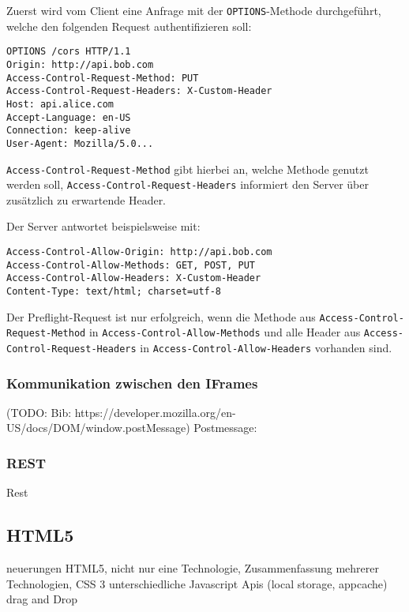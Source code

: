 Zuerst wird vom Client eine Anfrage mit der \texttt{OPTIONS}-Methode durchgeführt, welche den folgenden Request authentifizieren soll:
\begin{lstlisting}
OPTIONS /cors HTTP/1.1
Origin: http://api.bob.com
Access-Control-Request-Method: PUT
Access-Control-Request-Headers: X-Custom-Header
Host: api.alice.com
Accept-Language: en-US
Connection: keep-alive
User-Agent: Mozilla/5.0...
\end{lstlisting}
\texttt{Access-Control-Request-Method} gibt hierbei an, welche Methode genutzt werden soll, \texttt{Access-Control-Request-Headers} informiert den Server über zusätzlich zu erwartende Header. 

Der Server antwortet beispielsweise mit:
\begin{lstlisting}
Access-Control-Allow-Origin: http://api.bob.com
Access-Control-Allow-Methods: GET, POST, PUT
Access-Control-Allow-Headers: X-Custom-Header
Content-Type: text/html; charset=utf-8
\end{lstlisting}
Der Preflight-Request ist nur erfolgreich, wenn die Methode aus \texttt{Access-Control-Request-Method} in \texttt{Access-Control-Allow-Methods} und alle Header aus \texttt{Access-Control-Request-Headers} in \texttt{Access-Control-Allow-Headers} vorhanden sind.

\subsubsection{Kommunikation zwischen den IFrames}
(TODO: Bib: https://developer.mozilla.org/en-US/docs/DOM/window.postMessage)
Postmessage: 

\subsubsection{REST}\label{section:rest}
Rest

\subsection{HTML5}\label{section:html5}
neuerungen HTML5, nicht nur eine Technologie, Zusammenfassung mehrerer Technologien, CSS 3 unterschiedliche Javascript Apis (local storage, appcache) drag and Drop

